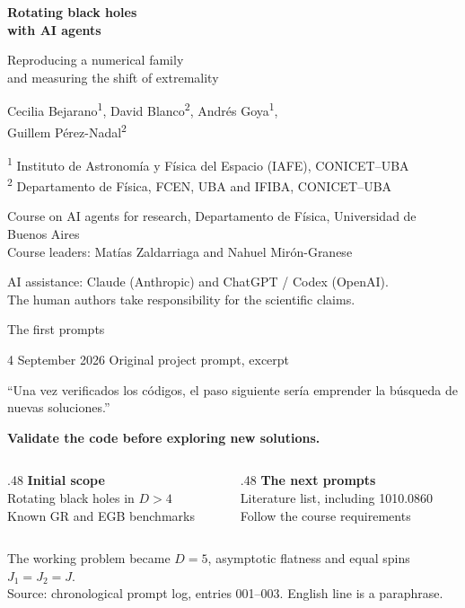\documentclass[20pt,aspectratio=169]{beamer}
\newcommand{\smallnote}[1]{{\fontsize{14}{17}\selectfont\color{muted}#1\par}}
\newcommand{\key}[1]{{\color{accent}\bfseries #1}}
\begin{document}
\begin{frame}
\relax
{\fontsize{42}{47}\selectfont\bfseries Rotating black holes\\with AI agents\par}
\vspace{5mm}
{\color{accent}\fontsize{25}{30}\selectfont Reproducing a numerical family\\and measuring the shift of extremality\par}
\vspace{8mm}
Cecilia Bejarano\textsuperscript{1}, David Blanco\textsuperscript{2}, Andrés Goya\textsuperscript{1},\\Guillem Pérez-Nadal\textsuperscript{2}\par
\vspace{4mm}
\smallnote{\textsuperscript{1} Instituto de Astronomía y Física del Espacio (IAFE), CONICET--UBA\\\textsuperscript{2} Departamento de Física, FCEN, UBA and IFIBA, CONICET--UBA}
\vspace{6mm}
\smallnote{Course on AI agents for research, Departamento de Física, Universidad de Buenos Aires\\Course leaders: Matías Zaldarriaga and Nahuel Mirón-Granese}
\vspace{4mm}
\smallnote{AI assistance: Claude (Anthropic) and ChatGPT / Codex (OpenAI).\\The human authors take responsibility for the scientific claims.}
\end{frame}
\begin{frame}{The first prompts}
\smallnote{4 September 2026 \quad Original project prompt, excerpt}
\vspace{5mm}
{\fontsize{26}{33}\selectfont ``Una vez verificados los códigos, el paso siguiente sería emprender la búsqueda de nuevas soluciones.''\par}
\vspace{7mm}
\key{Validate the code before exploring new solutions.}
\vspace{9mm}
\begin{columns}[T,onlytextwidth]
\begin{column}{.48\textwidth}
\key{Initial scope}\\[3mm]Rotating black holes in $D>4$\\Known GR and EGB benchmarks
\end{column}
\begin{column}{.48\textwidth}
\key{The next prompts}\\[3mm]Literature list, including 1010.0860\\Follow the course requirements
\end{column}
\end{columns}
\vspace{10mm}
\smallnote{The working problem became $D=5$, asymptotic flatness and equal spins $J_1=J_2=J$.\\Source: chronological prompt log, entries 001--003. English line is a paraphrase.}
\end{frame}
\end{document}
